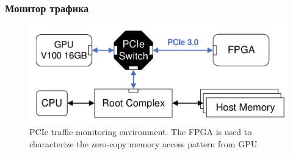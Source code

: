\documentclass[xcolor=table,english]{beamer}
\begin{document}
\begin{frame}[fragile] \frametitle{Монитор трафика}
    \begin{center}
    \begin{minipage}[m]{0.95\linewidth}
        \begin{figure}
            \centering
            \includegraphics[width=\textwidth]{figures/monitor_schema.png}
            \caption{PCIe traffic monitoring environment. The FPGA is used to characterize the zero-copy memory access pattern from GPU}
            \label{fig:monitor_schema}
        \end{figure}
    \end{minipage}\hfill
    \end{center}
\end{frame}
\end{document}
